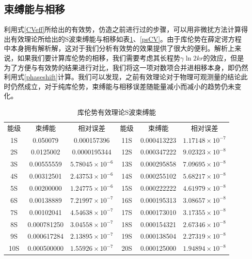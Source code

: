 \documentclass[cs4size,titlepage,twoside]{ctexart}
\begin{document}
\subsection{束缚能与相移}
利用式\eqref{CVeff}所给出的有效势，仿造之前进行过的步骤，可以用非微扰方法计算得出有效理论所给出的S波束缚能与相移如表\ref{enCV}、\ref{psCV}。由于库伦势在薛定谔方程中本身拥有解析解，这对于我们分析有效势的效果提供了很大的便利。解析上来说，如果我们要计算库伦势的相移，我们需要考虑其长程势$\gamma\ln2 kr$的效应，但是为了方便与有效势的结果进行对比，我们将这一项对数项合并进相移本身，即仍然利用式\eqref{phaseshift}计算。我们可以发现，之前有效理论对于物理可观测量的结论此时仍然成立，对于纯库伦势，束缚能与相移误差随能量减小而减小的趋势仍未变化。
\begin{table}[!tp]
	\centering
	\begin{tabular}{|cccccc|}
		\hline
		能级 & 束缚能   & 相对误差           & 能级 & 束缚能   & 相对误差           \\
		1S     & 0.050079    & 0.000157396            & 11S    & 0.000413223 & $1.17148\times10^{-7}$ \\
		2S     & 0.0125002   & 0.0000195344           & 12S    & 0.000347222 & $9.02323\times10^{-8}$ \\
		3S     & 0.00555559  & $5.78045\times10^{-6}$ & 13S    & 0.000295858 & $7.09695\times10^{-8}$ \\
		4S     & 0.00312501  & $2.43753\times10^{-6}$ & 14S    & 0.000255102 & $5.68217\times10^{-8}$ \\
		5S     & 0.00200000  & $1.24775\times10^{-6}$ & 15S    & 0.000222222 & $4.61979\times10^{-8}$ \\
		6S     & 0.00138889  & $7.21997\times10^{-7}$ & 16S    & 0.000195313 & $3.08657\times10^{-8}$ \\
		7S     & 0.00102041  & $4.54638\times10^{-7}$ & 17S    & 0.000173010 & $3.17355\times10^{-8}$ \\
		8S     & 0.000781250 & $3.04558\times10^{-7}$ & 18S    & 0.000154321 & $2.67346\times10^{-8}$ \\
		9S     & 0.000617284 & $2.13895\times10^{-7}$ & 19S    & 0.000138504 & $2.27319\times10^{-8}$ \\
		10S    & 0.000500000 & $1.55926\times10^{-7}$ & 20S    & 0.000125000 & $1.94894\times10^{-8}$ \\
		\hline
	\end{tabular}
	\caption{库伦势有效理论S波束缚能}\label{enCV}
\end{table}
\end{document}
